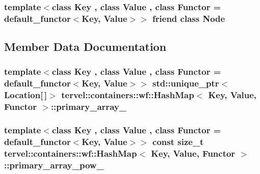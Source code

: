 \subsubsection[{Node}]{\setlength{\rightskip}{0pt plus 5cm}template$<$class Key , class Value , class Functor  = default\+\_\+functor$<$\+Key, Value$>$$>$ friend class {\bf Node}\hspace{0.3cm}{\ttfamily [friend]}}\label{classtervel_1_1containers_1_1wf_1_1_hash_map_a6db9d28bd448a131448276ee03de1e6d}


\subsection{Member Data Documentation}
\hypertarget{classtervel_1_1containers_1_1wf_1_1_hash_map_a501a15b166513ae18873d6d1d3da71a4}{}
\subsubsection[{primary\+\_\+array\+\_\+}]{\setlength{\rightskip}{0pt plus 5cm}template$<$class Key , class Value , class Functor  = default\+\_\+functor$<$\+Key, Value$>$$>$ std\+::unique\+\_\+ptr$<${\bf Location}\mbox{[}$\,$\mbox{]}$>$ {\bf tervel\+::containers\+::wf\+::\+Hash\+Map}$<$ Key, {\bf Value}, Functor $>$\+::primary\+\_\+array\+\_\+\hspace{0.3cm}{\ttfamily [private]}}\label{classtervel_1_1containers_1_1wf_1_1_hash_map_a501a15b166513ae18873d6d1d3da71a4}
\hypertarget{classtervel_1_1containers_1_1wf_1_1_hash_map_abaa36dc12509164a3c9612666a4eacbc}{}
\subsubsection[{primary\+\_\+array\+\_\+pow\+\_\+}]{\setlength{\rightskip}{0pt plus 5cm}template$<$class Key , class Value , class Functor  = default\+\_\+functor$<$\+Key, Value$>$$>$ const size\+\_\+t {\bf tervel\+::containers\+::wf\+::\+Hash\+Map}$<$ Key, {\bf Value}, Functor $>$\+::primary\+\_\+array\+\_\+pow\+\_\+\hspace{0.3cm}{\ttfamily [private]}}\label{classtervel_1_1containers_1_1wf_1_1_hash_map_abaa36dc12509164a3c9612666a4eacbc}
\hypertarget{classtervel_1_1containers_1_1wf_1_1_hash_map_a33e402d5fcf528ee13dbe5aa3f893fa2}{}
